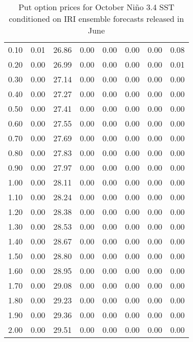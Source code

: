 \begin{table*}[ht]
\begin{tabular}{rrrrrrrr}
  0.10 & 0.01 & 26.86 & 0.00 & 0.00 & 0.00 & 0.00 & 0.08 \\ 
  0.20 & 0.00 & 26.99 & 0.00 & 0.00 & 0.00 & 0.00 & 0.01 \\ 
  0.30 & 0.00 & 27.14 & 0.00 & 0.00 & 0.00 & 0.00 & 0.00 \\ 
  0.40 & 0.00 & 27.27 & 0.00 & 0.00 & 0.00 & 0.00 & 0.00 \\ 
  0.50 & 0.00 & 27.41 & 0.00 & 0.00 & 0.00 & 0.00 & 0.00 \\ 
  0.60 & 0.00 & 27.55 & 0.00 & 0.00 & 0.00 & 0.00 & 0.00 \\ 
  0.70 & 0.00 & 27.69 & 0.00 & 0.00 & 0.00 & 0.00 & 0.00 \\ 
  0.80 & 0.00 & 27.83 & 0.00 & 0.00 & 0.00 & 0.00 & 0.00 \\ 
  0.90 & 0.00 & 27.97 & 0.00 & 0.00 & 0.00 & 0.00 & 0.00 \\ 
  1.00 & 0.00 & 28.11 & 0.00 & 0.00 & 0.00 & 0.00 & 0.00 \\ 
  1.10 & 0.00 & 28.24 & 0.00 & 0.00 & 0.00 & 0.00 & 0.00 \\ 
  1.20 & 0.00 & 28.38 & 0.00 & 0.00 & 0.00 & 0.00 & 0.00 \\ 
  1.30 & 0.00 & 28.53 & 0.00 & 0.00 & 0.00 & 0.00 & 0.00 \\ 
  1.40 & 0.00 & 28.67 & 0.00 & 0.00 & 0.00 & 0.00 & 0.00 \\ 
  1.50 & 0.00 & 28.80 & 0.00 & 0.00 & 0.00 & 0.00 & 0.00 \\ 
  1.60 & 0.00 & 28.95 & 0.00 & 0.00 & 0.00 & 0.00 & 0.00 \\ 
  1.70 & 0.00 & 29.08 & 0.00 & 0.00 & 0.00 & 0.00 & 0.00 \\ 
  1.80 & 0.00 & 29.23 & 0.00 & 0.00 & 0.00 & 0.00 & 0.00 \\ 
  1.90 & 0.00 & 29.36 & 0.00 & 0.00 & 0.00 & 0.00 & 0.00 \\ 
  2.00 & 0.00 & 29.51 & 0.00 & 0.00 & 0.00 & 0.00 & 0.00 \\ 
   \hline
\end{tabular}
\caption[Put option prices for October Ni\~no 3.4 SST conditioned on IRI ensemble forecasts released in June]{Put option prices for October Ni\~no 3.4 SST conditioned on IRI ensemble forecasts released in June} 
\label{tab:pricesOctSub}
\end{table*}
